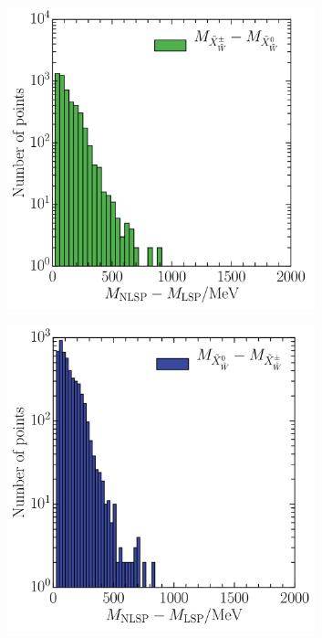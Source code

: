 \begin{figure}
    \centering
    \begin{subfigure}[b]{0.49\textwidth}
      \centering
      \includegraphics[width=0.98\textwidth]{figs/rpvthreel/MassDegenerateChipm.png}
      \caption{}
      \label{fig:massdega}
    \end{subfigure}
    \hfill
    \begin{subfigure}[b]{0.49\textwidth}
      \centering
      \includegraphics[width=0.98\textwidth]{figs/rpvthreel/MassDegenerateChi0.png}

\end{subfigure}
\end{figure}

